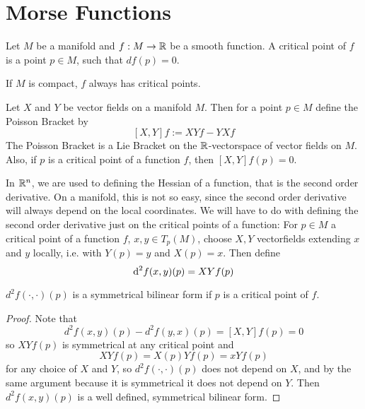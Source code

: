 \section{Morse Functions}

\begin{definition}
    Let $M$ be a manifold and $f: M \to { \mathbb R }$ be a smooth function. A critical point of
    $f$ is a point $p \in M$, such that $df(p) = 0$.
\end{definition}

\begin{remark}
    If $M$ is compact, $f$ always has critical points.
\end{remark}

\begin{definition}
    Let $X$ and $Y$ be vector fields on a manifold $M$. Then for a point $p \in M$ define
    the Poisson Bracket by
    \[  [X, Y]f := XYf - YXf \]
    The Poisson Bracket is a Lie Bracket on the ${ \mathbb R }$-vectorspace of vector fields on $M$.
    Also, if $p$ is a critical point of a function $f$, then $[X, Y]f (p) = 0$.
\end{definition}

\begin{definition}[Hessian]
    In ${ \mathbb R }^n$, we are used to defining the Hessian of a function, that is the second order
    derivative. On a manifold, this is not so easy, since the second order derivative will 
    always depend on the local coordinates. We will have to do with defining 
    the second order derivative just on the critical points of a function:
    For $p \in M$ a critical point of a function $f$, $x, y \in T_p(M)$, choose $X, Y$
    vectorfields extending $x$ and $y$ locally, i.e. with $Y(p) = y$ and $X(p) = x$. 
    Then define
    \[ { \operatorname{d} }^2 f (x, y) (p) = XYf (p) \]
\end{definition}

\begin{lemma}
    $d^2 f (\cdot, \cdot) (p)$ is a symmetrical bilinear form if $p$ is a critical point of
    $f$.
\end{lemma}

\begin{proof}
    Note that
    \[ d^2 f (x, y) (p) - d^2 f (y, x) (p) = [X, Y]f (p) = 0  \]
    so $XYf(p)$ is symmetrical at any critical point and
    \[ XYf (p) = X(p)Yf(p) = xYf(p) \]
    for any choice of $X$ and $Y$, so $d^2 f(\cdot, \cdot) (p)$ does not depend
    on $X$, and by the same argument because it is symmetrical it does not depend on $Y$.
    Then $d^2 f (x, y) (p)$ is a well defined, symmetrical bilinear form.
\end{proof}

